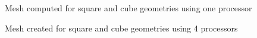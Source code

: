 \begin{figure}[!ht]
\centering
{}
\caption{Mesh computed for square and cube geometries using one processor}
\end{figure}
\label{fig:tuto_mesh-1}

\begin{figure}[!ht]
\centering
{}
\caption{Mesh created for square and cube geometries using 4 processors}
\end{figure}
\label{fig:tuto_mesh-2}


